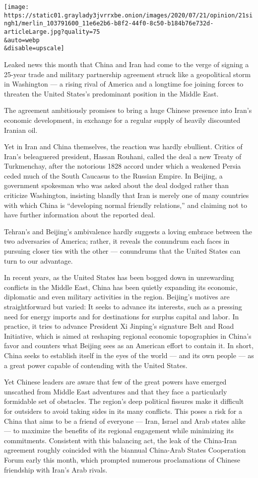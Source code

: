 \texttt{[image: https://static01.graylady3jvrrxbe.onion/images/2020/07/21/opinion/21singh1/merlin\_103791600\_11e6e2b6-b8f2-44f0-8c50-b184b76e732d-articleLarge.jpg?quality=75\\\&auto=webp\\\&disable=upscale]}

Leaked news this month that China and Iran had come to the verge of
signing a 25-year trade and military partnership agreement struck like a
geopolitical storm in Washington --- a rising rival of America and a
longtime foe joining forces to threaten the United States's predominant
position in the Middle East.

The agreement ambitiously promises to bring a huge Chinese presence into
Iran's economic development, in exchange for a regular supply of heavily
discounted Iranian oil.

Yet in Iran and China themselves, the reaction was hardly ebullient.
Critics of Iran's beleaguered president, Hassan Rouhani, called the deal
a new Treaty of Turkmenchay, after the notorious 1828 accord under which
a weakened Persia ceded much of the South Caucasus to the Russian
Empire. In Beijing, a government spokesman who was asked about the deal
dodged rather than criticize Washington, insisting blandly that Iran is
merely one of many countries with which China is ``developing normal
friendly relations,'' and claiming not to have further information about
the reported deal.

Tehran's and Beijing's ambivalence hardly suggests a loving embrace
between the two adversaries of America; rather, it reveals the conundrum
each faces in pursuing closer ties with the other --- conundrums that
the United States can turn to our advantage.

In recent years, as the United States has been bogged down in
unrewarding conflicts in the Middle East, China has been quietly
expanding its economic, diplomatic and even military activities in the
region. Beijing's motives are straightforward but varied: It seeks to
advance its interests, such as a pressing need for energy imports and
for destinations for surplus capital and labor. In practice, it tries to
advance President Xi Jinping's signature Belt and Road Initiative, which
is aimed at reshaping regional economic topographies in China's favor
and counters what Beijing sees as an American effort to contain it. In
short, China seeks to establish itself in the eyes of the world --- and
its own people --- as a great power capable of contending with the
United States.

Yet Chinese leaders are aware that few of the great powers have emerged
unscathed from Middle East adventures and that they face a particularly
formidable set of obstacles. The region's deep political fissures make
it difficult for outsiders to avoid taking sides in its many conflicts.
This poses a risk for a China that aims to be a friend of everyone ---
Iran, Israel and Arab states alike --- to maximize the benefits of its
regional engagement while minimizing its commitments. Consistent with
this balancing act, the leak of the China-Iran agreement roughly
coincided with the biannual China-Arab States Cooperation Forum early
this month, which prompted numerous proclamations of Chinese friendship
with Iran's Arab rivals.

